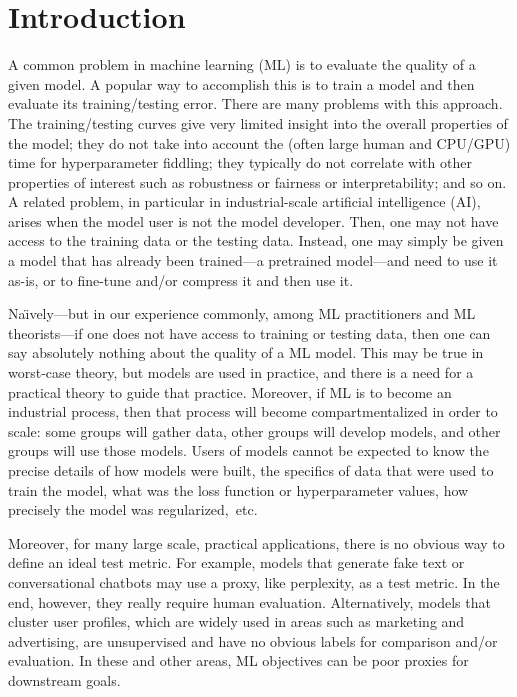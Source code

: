 \section{Introduction}
\label{sxn:intro}

A common problem in machine learning (ML) 
is to evaluate the quality of a given model.
A popular way to accomplish this
is to train a model and then evaluate its training/testing error.
There are many problems with this approach.
The training/testing curves give very limited insight into the overall properties of the model; 
they do not take into account the (often large human and CPU/GPU) time for hyperparameter fiddling;
they typically do not correlate with other properties of interest such as robustness or fairness or interpretability; 
and so on.
A related problem, in particular in industrial-scale artificial intelligence (AI), arises when the model user is not the model developer.
Then, one may not have access to the training data or the testing data.
Instead, one may simply be given a model that has already been trained---a pretrained model---and need to use it as-is, or to fine-tune and/or compress it and then use it.

Na\"{\i}vely---but in our experience commonly, among ML practitioners and ML theorists---if one does not have access to training or testing data, then one can say absolutely nothing about the quality of a ML model.
This may be true in worst-case theory, but models are used in practice, and there is a need for a practical theory to guide that practice.
Moreover, if ML is to become an industrial process, then that process will become compartmentalized in order to scale: some groups will gather data, other groups will develop models, and other groups will use those models.
Users of models cannot be expected to know the precise details of how models were built, the specifics of data that were used to train the model, what was the loss function or hyperparameter values, how precisely the model was regularized,~etc.

Moreover, for many large scale, practical applications, there is no obvious way to define an ideal test metric. 
For example, models that generate fake text or conversational chatbots may use a proxy, like perplexity, as a test metric.
In the end, however, they really require human evaluation. 
Alternatively, models that cluster user profiles, which are widely used in areas such as marketing and advertising, are unsupervised and have no obvious labels for comparison and/or evaluation.
In these and other areas, ML objectives can be poor proxies for downstream goals.

